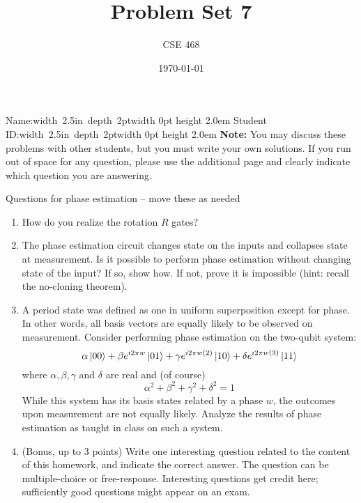 \documentclass[12pt]{article}
\title{Problem Set 7}
\author{CSE 468}
\date{\today}
\newcommand{\NameBlank}{\mbox{\hskip 4pt\vrule width 2.5in depth 2pt}\vrule width 0pt height 2.0em}
\begin{document}
\maketitle

\noindent Name:\NameBlank{} \newline
\noindent Student ID:\NameBlank{} \newline
\textbf{Note:} You may discuss these problems with other students, but you must write your own solutions. If you run out of space for any question, please use the additional page and clearly indicate which question you are answering.

Questions for phase estimation -- move these as needed

\begin{enumerate}[font=\bfseries]
    \item How do you realize the rotation $R$ gates?
    \item The phase estimation circuit changes state on the inputs and collapses state at measurement.  Is it possible to perform phase estimation without changing state of the input?  If so, show how. If not, prove it is impossible (hint:  recall the no-cloning theorem).
    \item A period state was defined as one in uniform superposition except for phase.  In other words, all basis vectors are equally likely to be observed on measurement.  Consider performing phase estimation on the two-qubit system:
    \[ \alpha\ket{00} + \beta e^{i 2\pi w}\ket{01} 
        + \gamma e^{i 2\pi w(2)}\ket{10} + \delta e^{i 2\pi w(3)}\ket{11}
    \]
    where $\alpha, \beta, \gamma$ and $\delta$ are real and (of course)
    \[ \alpha^{2} + \beta^{2} + \gamma^{2} + \delta^{2}=1 \]
    While this system has its basis states related by a phase $w$, the outcomes upon measurement are not equally likely.  Analyze the results of phase estimation as taught in class on such a system.
    \item (Bonus, up to 3 points) Write one interesting question related to the content of this homework, and indicate the correct answer. The question can be multiple-choice or free-response.  Interesting questions get credit here;  sufficiently good questions might appear on an exam.
    
\end{enumerate}
\end{document}
